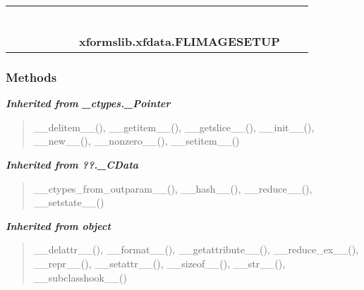     \label{xformslib:xfdata:FLIMAGESETUP}
\begin{tabular}{cccccccccc}
\multicolumn{2}{r}{\settowidth{\BCL}{object}\multirow{2}{\BCL}{object}}
&&
&&
&&
  \\\cline{3-3}
  &&\multicolumn{1}{c|}{}
&&
&&
&&
  \\
\multicolumn{4}{r}{\settowidth{\BCL}{??.\_CData}\multirow{2}{\BCL}{??.\_CData}}
&&
&&
  \\\cline{5-5}
  &&&&\multicolumn{1}{c|}{}
&&
&&
  \\
\multicolumn{6}{r}{\settowidth{\BCL}{\_ctypes.\_Pointer}\multirow{2}{\BCL}{\_ctypes.\_Pointer}}
&&
  \\\cline{7-7}
  &&&&&&\multicolumn{1}{c|}{}
&&
  \\
&&&&&&\multicolumn{2}{l}{\textbf{xformslib.xfdata.FLIMAGESETUP}}
\end{tabular}



  \subsubsection{Methods}


\large{\textbf{\textit{Inherited from \_ctypes.\_Pointer}}}

\begin{quote}
\_\_delitem\_\_(), \_\_getitem\_\_(), \_\_getslice\_\_(), \_\_init\_\_(), \_\_new\_\_(), \_\_nonzero\_\_(), \_\_setitem\_\_()
\end{quote}

\large{\textbf{\textit{Inherited from ??.\_CData}}}

\begin{quote}
\_\_ctypes\_from\_outparam\_\_(), \_\_hash\_\_(), \_\_reduce\_\_(), \_\_setstate\_\_()
\end{quote}

\large{\textbf{\textit{Inherited from object}}}

\begin{quote}
\_\_delattr\_\_(), \_\_format\_\_(), \_\_getattribute\_\_(), \_\_reduce\_ex\_\_(), \_\_repr\_\_(), \_\_setattr\_\_(), \_\_sizeof\_\_(), \_\_str\_\_(), \_\_subclasshook\_\_()
\end{quote}

